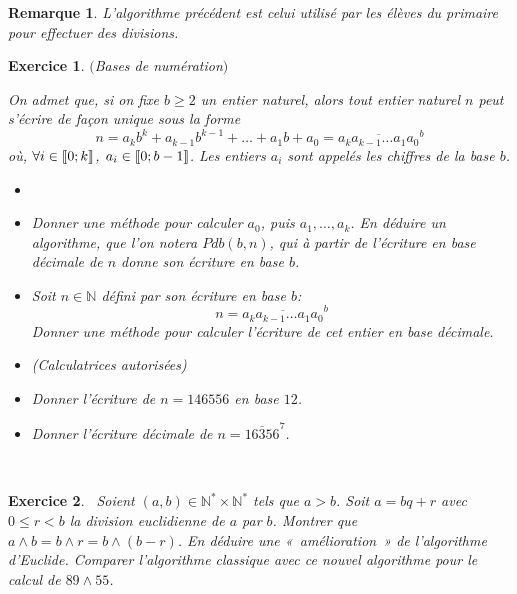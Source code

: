 \documentclass[11pt,a4paper]{article}
\newtheorem{ex}{Exercice}
\newtheorem*{remarque}{Remarque}
\newcommand{\N}{\mathbb{N}}
\begin{document}
\begin{remarque}
 L'algorithme précédent est celui utilisé par les élèves du primaire pour effectuer des divisions.%
\end{remarque}


\begin{ex}\label{exBases de numération}$($Bases de numération$)$

On admet que, si on fixe $b\geqslant 2$ un entier naturel, alors tout entier naturel $n$ peut s'écrire de façon unique sous la forme
$$ n=a_k b^k +a_{k-1}b^{k-1}+ \ldots + a_1 b +a_0= \overline{a_k a_{k-1}\ldots a_1 a_0}^b  $$
où, $ \forall i \in \llbracket 0; k \rrbracket $, $a_i \in \llbracket 0; b-1 \rrbracket$. Les entiers $a_i$ sont appelés les chiffres de la base $b$.
\begin{itemize}
\item[\textbf{Algorithmes}] 
\item[$1.$] Donner une méthode pour calculer $a_0$, puis $a_1, \ldots, a_k$.  En déduire un algorithme, que l'on notera $Pdb(b,n)$, qui à partir de l'écriture en base décimale de $n$ donne son écriture en base $b$. 
\item[$2.$] Soit $n \in \mathbb{N}$ défini par son écriture en base $b$:
$$ n=\overline{a_k a_{k-1}\ldots a_1 a_0}^b  $$
Donner une méthode pour calculer l'écriture de cet entier en base décimale. 
\item[\textbf{Applications}](Calculatrices autorisées)
\item[$3.$] Donner l'écriture de $n=146556$ en base $12$.
\item[$4.$] Donner l'écriture décimale de $n=\overline{16356}^7$.
\end{itemize}

\end{ex}


\

\begin{ex}\label{exOptimisation_algo_Euclide}\
Soient $(a,b)\in \N^*\times \N^*$ tels que $a>b$. Soit  $a=bq+r$ avec $0 \leq  r <b$ la division euclidienne de $a$ par $b$. Montrer que $a\wedge b=b\wedge r=b\wedge (b-r)$. En déduire une «~amélioration~» de l'algorithme d'Euclide. Comparer l'algorithme classique avec ce nouvel algorithme pour le calcul de $89\wedge 55$.
\end{ex}
\end{document}
